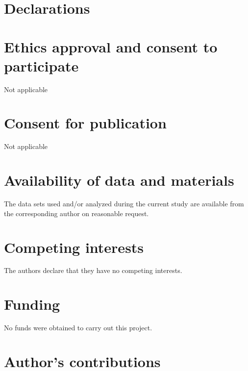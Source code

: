 \documentclass{bmcart}
\begin{document}
\begin{backmatter}



\section*{Declarations} 
\hfill


\section*{Ethics approval and consent to participate}

Not applicable


\section*{Consent for publication}

Not applicable

\section*{Availability of data and materials}

The data sets used and/or analyzed during the current study are available from the corresponding author on reasonable request.

\section*{Competing interests}
The authors declare that they have no competing interests.


\section*{Funding}

No funds were obtained to carry out this project.


\section*{Author's contributions}


\end{backmatter}
\end{document}
